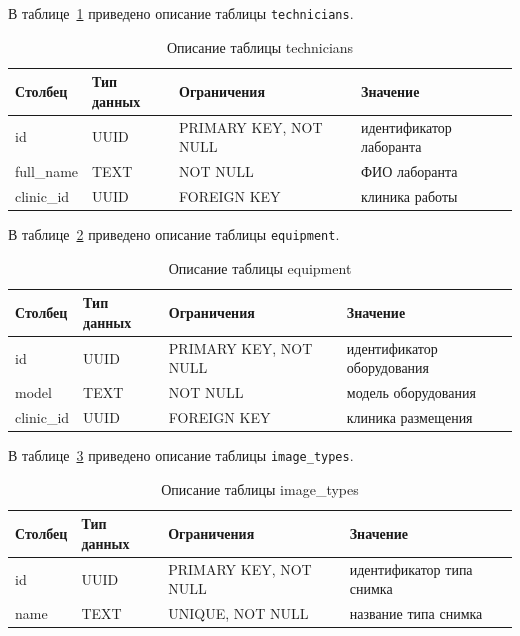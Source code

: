 В таблице~\ref{tab:technicians-design} приведено описание таблицы \texttt{technicians}.

\begin{table}[H]
	\caption{Описание таблицы technicians}
	\label{tab:technicians-design}
	\centering
	\begin{tabular}{|p{}|p{}|p{}|p{}|}
		\hline
		Столбец & Тип данных & Ограничения & Значение \\
		\hline
		id & UUID & PRIMARY KEY, NOT NULL & идентификатор лаборанта \\
		\hline
		full\_name & TEXT & NOT NULL & ФИО лаборанта \\
		\hline
		clinic\_id & UUID & FOREIGN KEY & клиника работы \\
		\hline
	\end{tabular}
\end{table}

В таблице~\ref{tab:equipment-design} приведено описание таблицы \texttt{equipment}.

\begin{table}[H]
	\caption{Описание таблицы equipment}
	\label{tab:equipment-design}
	\centering
	\begin{tabular}{|p{}|p{}|p{}|p{}|}
		\hline
		Столбец & Тип данных & Ограничения & Значение \\
		\hline
		id & UUID & PRIMARY KEY, NOT NULL & идентификатор оборудования \\
		\hline
		model & TEXT & NOT NULL & модель оборудования \\
		\hline
		clinic\_id & UUID & FOREIGN KEY & клиника размещения \\
		\hline
	\end{tabular}
\end{table}

В таблице~\ref{tab:image-types-design} приведено описание таблицы \texttt{image\_types}.

\begin{table}[H]
	\caption{Описание таблицы image\_types}
	\label{tab:image-types-design}
	\centering
	\begin{tabular}{|p{}|p{}|p{}|p{}|}
		\hline
		Столбец & Тип данных & Ограничения & Значение \\
		\hline
		id & UUID & PRIMARY KEY, NOT NULL & идентификатор типа снимка \\
		\hline
		name & TEXT & UNIQUE, NOT NULL & название типа снимка \\
		\hline
	\end{tabular}
\end{table}

